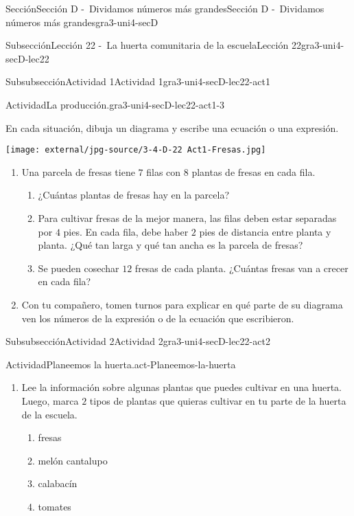 \documentclass[twoside,14pt,]{extarticle}
\begin{document}
\begin{sectionptx}{Sección}{Sección D -~Dividamos números más grandes}{}{Sección D -~Dividamos números más grandes}{}{}{gra3-uni4-secD}
\begin{subsectionptx}{Subsección}{Lección 22 -~La huerta comunitaria de la escuela}{}{Lección 22}{}{}{gra3-uni4-secD-lec22}
\begin{subsubsectionptx}{Subsubsección}{Actividad 1}{}{Actividad 1}{}{}{gra3-uni4-secD-lec22-act1}
\begin{activity}{Actividad}{La producción.}{gra3-uni4-secD-lec22-act1-3}
\begin{sidebyside}{2}{0}{0}{0}
\begin{sbspanel}{0.5}%
En cada situación, dibuja un diagrama y escribe una ecuación o una expresión.%
\end{sbspanel}%
\begin{sbspanel}{0.5}%
\texttt{[image: external/jpg-source/3-4-D-22 Act1-Fresas.jpg]}
\end{sbspanel}%
\end{sidebyside}%
%
\begin{enumerate}
\item{}Una parcela de fresas tiene \(7\) filas con \(8\) plantas de fresas en cada fila.%
%
\begin{enumerate}
\item{}¿Cuántas plantas de fresas hay en la parcela?%
\item{}Para cultivar fresas de la mejor manera, las filas deben estar separadas por \(4\) pies. En cada fila, debe haber \(2\) pies de distancia entre planta y planta. ¿Qué tan larga y qué tan ancha es la parcela de fresas?%
\item{}Se pueden cosechar \(12\) fresas de cada planta. ¿Cuántas fresas van a crecer en cada fila?%
\end{enumerate}
\item{}Con tu compañero, tomen turnos para explicar en qué parte de su diagrama ven los números de la expresión o de la ecuación que escribieron.%
\end{enumerate}
\end{activity}%
\end{subsubsectionptx}
%
%
\typeout{************************************************}
\typeout{************************************************}
%
\begin{subsubsectionptx}{Subsubsección}{Actividad 2}{}{Actividad 2}{}{}{gra3-uni4-secD-lec22-act2}
\begin{activity}{Actividad}{Planeemos la huerta.}{act-Planeemos-la-huerta}%
%
\begin{enumerate}
\item{}Lee la información sobre algunas plantas que puedes cultivar en una huerta. Luego, marca \(2\) tipos de plantas que quieras cultivar en tu parte de la huerta de la escuela.%
%
\begin{enumerate}
\item{}fresas%
\item{}melón cantalupo%
\item{}calabacín%
\item{}tomates%

\end{enumerate}
\end{enumerate}
\end{activity}
\end{subsubsectionptx}
\end{subsectionptx}
\end{sectionptx}
\end{document}
